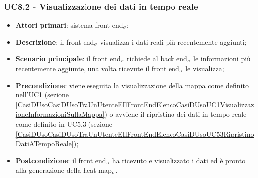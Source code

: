 \subsubsection{UC8.2 - Visualizzazione dei dati in tempo reale}\label{CasiDUsoCasiDUsoTraIlFrontEndEIlBackEndElencoDeiCasiDUsoUC82VisualizzazioneDeiDatiInTempoReale}
\begin{itemize}
	\item \textbf{Attori primari}: sistema front end$_{\scaleto{G}{3pt}}$;
	\item \textbf{Descrizione}: il front end$_{\scaleto{G}{3pt}}$ visualizza i dati reali più recentemente aggiunti;
	\item \textbf{Scenario principale}: il front end$_{\scaleto{G}{3pt}}$ richiede al back end$_{\scaleto{G}{3pt}}$ le informazioni più recentemente aggiunte, una volta ricevute il front end$_{\scaleto{G}{3pt}}$ le visualizza;
	\item \textbf{Precondizione}: viene eseguita la visualizzazione della mappa come definito nell’UC1 (sezione \ref{CasiDUsoCasiDUsoTraUnUtenteEIlFrontEndElencoCasiDUsoUC1VisualizzazioneInformazioniSullaMappa}) o avviene il ripristino dei dati in tempo reale come definito in UC5.3 (sezione \ref{CasiDUsoCasiDUsoTraUnUtenteEIlFrontEndElencoCasiDUsoUC53RipristinoDatiATempoReale});
	\item \textbf{Postcondizione}: il front end$_{\scaleto{G}{3pt}}$ ha ricevuto e visualizzato i dati ed è pronto alla generazione della heat map$_{\scaleto{G}{3pt}}$.
\end{itemize}

